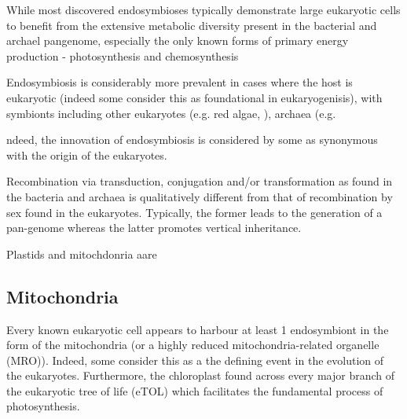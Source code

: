 While most discovered endosymbioses typically demonstrate large eukaryotic cells to benefit from the extensive metabolic diversity
present in the bacterial and archael pangenome, especially the only known forms of primary energy
production - photosynthesis and chemosynthesis \citep{Wernegreen2012}

Endosymbiosis is considerably more prevalent in cases where the host is eukaryotic (indeed some consider this as foundational 
in eukaryogenisis), with symbionts including other eukaryotes (e.g. red algae, ), archaea (e.g. 

ndeed, the innovation of endosymbiosis is considered by some as synonymous with the origin of the eukaryotes.





Recombination via transduction, conjugation and/or transformation as found in the bacteria and archaea is
qualitatively different from that of recombination by sex found in the eukaryotes. 
Typically, the former leads to the generation of a pan-genome whereas the latter promotes vertical inheritance. \citep{Ku2015}







Plastids and mitochdonria aare 





\subsection{Mitochondria}

Every known eukaryotic cell appears to harbour at least 1 endosymbiont in the form of the mitochondria (or a highly
reduced mitochondria-related organelle (MRO)). Indeed, some consider this as a the defining event in the 
evolution of the eukaryotes.  Furthermore, the chloroplast found across every major branch of the eukaryotic tree of life (eTOL)
which facilitates the fundamental process of photosynthesis.





